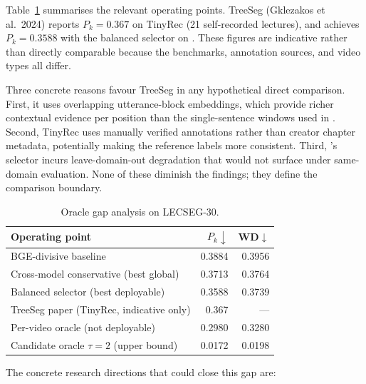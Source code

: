 Table~\ref{tab:oracle_gap} summarises the relevant operating points.
TreeSeg (Gklezakos et al.\ 2024) reports $P_k=0.367$ on TinyRec (21
self-recorded lectures), and \lecseg{} achieves $P_k=0.3588$ with the balanced
selector on \dataset{}.
These figures are indicative rather than directly comparable because the
benchmarks, annotation sources, and video types all differ.

Three concrete reasons favour TreeSeg in any hypothetical direct comparison.
First, it uses overlapping utterance-block embeddings, which provide
richer contextual evidence per position than the single-sentence windows used
in \lecseg{}.
Second, TinyRec uses manually verified annotations rather than creator
chapter metadata, potentially making the reference labels more consistent.
Third, \lecseg{}'s selector incurs leave-domain-out degradation that would
not surface under same-domain evaluation.
None of these diminish the \lecseg{} findings; they define the comparison boundary.

\begin{table}[h]
  \centering
  \caption{Oracle gap analysis on LECSEG-30.}
  \label{tab:oracle_gap}
  \begin{tabular}{lrr}
    \toprule
    Operating point & $P_k\downarrow$ & WD$\downarrow$ \\
    \midrule
    BGE-divisive baseline & 0.3884 & 0.3956 \\
    Cross-model conservative (best global) & 0.3713 & 0.3764 \\
    Balanced selector (best deployable) & 0.3588 & 0.3739 \\
    TreeSeg paper (TinyRec, indicative only) & 0.367 & --- \\
    Per-video oracle (not deployable) & 0.2980 & 0.3280 \\
    Candidate oracle $\tau=2$ (upper bound) & 0.0172 & 0.0198 \\
    \bottomrule
  \end{tabular}
\end{table}

The concrete research directions that could close this gap are:

